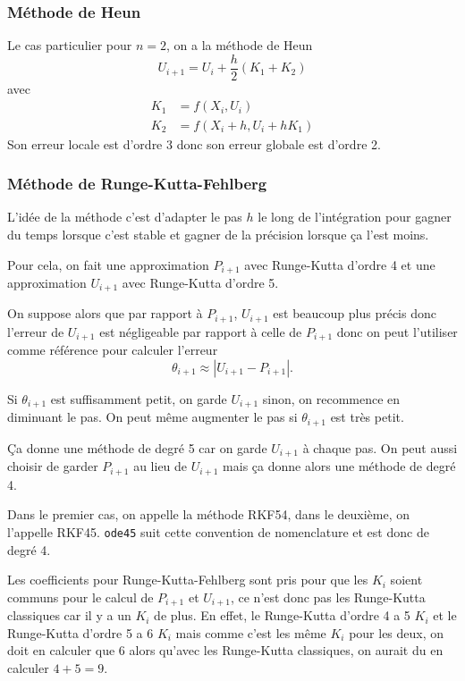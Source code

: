 \subsubsection{Méthode de Heun}
Le cas particulier pour $n = 2$,
on a la méthode de Heun
\[ U_{i+1} = U_i + \frac{h}{2}(K_1 + K_2) \]
avec
\begin{align*}
  K_1 & = f(X_i, U_i)\\
  K_2 & = f(X_i + h, U_i + hK_1)
\end{align*}
Son erreur locale est d'ordre 3 donc son erreur globale est d'ordre 2.

\subsubsection{Méthode de Runge-Kutta-Fehlberg}
L'idée de la méthode c'est d'adapter le pas $h$ le long de l'intégration
pour gagner du temps lorsque c'est stable et gagner de la précision
lorsque ça l'est moins.

Pour cela, on fait une approximation $P_{i+1}$ avec Runge-Kutta d'ordre 4
et une approximation $U_{i+1}$ avec Runge-Kutta d'ordre 5.

On suppose alors que par rapport à $P_{i+1}$, $U_{i+1}$ est beaucoup plus
précis donc l'erreur de $U_{i+1}$ est négligeable par rapport à celle
de $P_{i+1}$ donc on peut l'utiliser comme référence pour calculer
l'erreur
\[ \theta_{i+1} \approx |U_{i+1} - P_{i+1}|. \]

Si $\theta_{i+1}$ est suffisamment petit, on garde $U_{i+1}$ sinon,
on recommence en diminuant le pas.
On peut même augmenter le pas si $\theta_{i+1}$ est très petit.

Ça donne une méthode de degré 5 car on garde $U_{i+1}$ à chaque pas.
On peut aussi choisir de garder $P_{i+1}$ au lieu de $U_{i+1}$ mais ça donne
alors une méthode de degré 4.

Dans le premier cas, on appelle la méthode RKF54,
dans le deuxième, on l'appelle RKF45.
\lstinline|ode45| suit cette convention de nomenclature et est
donc de degré 4.

\begin{myrem}
  Les coefficients pour Runge-Kutta-Fehlberg sont pris pour que
  les $K_i$ soient communs pour le calcul de $P_{i+1}$ et $U_{i+1}$,
  ce n'est donc pas les Runge-Kutta classiques car il y a un $K_i$ de plus.
  En effet, le Runge-Kutta d'ordre 4 a 5 $K_i$ et le Runge-Kutta d'ordre
  5 a 6 $K_i$ mais comme c'est les même $K_i$ pour les deux, on doit
  en calculer que 6 alors qu'avec les Runge-Kutta classiques,
  on aurait du en calculer $4 + 5 = 9$.
\end{myrem}

